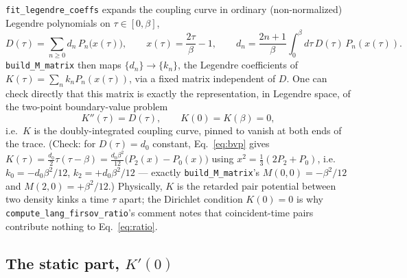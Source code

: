 \documentclass[a4paper,12pt]{article}
\renewcommand{\t}{\ensuremath{\tau}}
\begin{document}
\texttt{fit\_legendre\_coeffs} expands the coupling curve in ordinary (non-normalized)
Legendre polynomials on $\t\in[0,\beta]$,
\begin{equation}
  D(\t) = \sum_{n\ge0} d_n\, P_n\big(x(\t)\big), \qquad x(\t) = \frac{2\t}{\beta}-1,
  \qquad d_n = \frac{2n+1}{\beta}\int_0^\beta \! d\t\, D(\t)\, P_n(x(\t)).
  \label{eq:dn}
\end{equation}
\texttt{build\_M\_matrix} then maps $\{d_n\}\to\{k_n\}$, the Legendre coefficients of
$K(\t)=\sum_n k_n P_n(x(\t))$, via a fixed matrix independent of $D$. One can check
directly that this matrix is exactly the representation, in Legendre space, of the
two-point boundary-value problem
\begin{equation}
  K''(\t) = D(\t), \qquad K(0)=K(\beta)=0,
  \label{eq:bvp}
\end{equation}
i.e.\ $K$ is the doubly-integrated coupling curve, pinned to vanish at both ends of the
trace. (Check: for $D(\t)=d_0$ constant, Eq.~\eqref{eq:bvp} gives
$K(\t)=\tfrac{d_0}{2}\t(\t-\beta) = \tfrac{d_0\beta^2}{12}\big(P_2(x)-P_0(x)\big)$ using
$x^2=\tfrac13(2P_2+P_0)$, i.e.\ $k_0=-d_0\beta^2/12$, $k_2=+d_0\beta^2/12$ ---
exactly \texttt{build\_M\_matrix}'s $M(0,0)=-\beta^2/12$ and $M(2,0)=+\beta^2/12$.)
Physically, $K$ is the retarded pair potential between two density kinks a time $\t$
apart; the Dirichlet condition $K(0)=0$ is why \texttt{compute\_lang\_firsov\_ratio}'s
comment notes that coincident-time pairs contribute nothing to Eq.~\eqref{eq:ratio}.

\subsection{The static part, $K'(0)$}
\label{sec:kprime}
\end{document}
